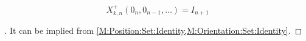 \documentclass[stu, babel, american, biblatex, a4paper, leqno, draftall]{apa7}
\begin{document}
\begin{corollary}\label{M:Point:Set:Identity}
    \begin{equation*}
    	X^{+}_{k,n}
    	\left(0_{n}, 0_{n-1}, \dots\right)
    	=
    	I_{n+1}
    \end{equation*}
\end{corollary}
\begin{proof}[]
	It can be implied from \cref{M:Position:Set:Identity,M:Orientation:Set:Identity}.
\end{proof}

\end{document}
